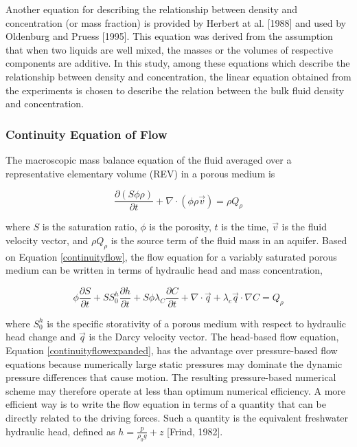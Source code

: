 Another equation for describing the relationship between density and
concentration (or mass fraction) is provided by Herbert at al.
[1988] and used by Oldenburg and Pruess [1995]. This equation was
derived from the assumption that when two liquids are well mixed,
the masses or the volumes of respective components are additive. In
this study, among these equations which describe the relationship
between density and concentration, the linear equation obtained from
the experiments is chosen to describe the relation between the bulk
fluid density and concentration.

\subsubsection{Continuity Equation of Flow}\label{SS:ContinuityFlowEquation}
The macroscopic mass balance equation of the fluid averaged over a
representative elementary volume (REV) in a porous medium is

\begin{equation}\label{continuityflow}
\frac{{\partial \left( {S\phi \rho } \right)}}{{\partial t}} +
\nabla  \cdot \left( {\phi \rho \vec v} \right) = \rho Q_\rho
\end{equation}

where $S$ is the saturation ratio, $\phi$ is the porosity, $t$ is
the time, $\vec v$ is the fluid velocity vector, and $\rho Q_\rho$
is the source term of the fluid mass in an aquifer. Based on
Equation \ref{continuityflow}, the flow equation for a variably
saturated porous medium can be written in terms of hydraulic head
and mass concentration,

\begin{equation}\label{continuityflowexpanded}
\phi \frac{{\partial S}}{{\partial t}} + SS_0^h \frac{{\partial
h}}{{\partial t}} + S\phi \lambda _C \frac{{\partial C}}{{\partial
t}} + \nabla  \cdot \vec q + \lambda _c \vec q \cdot \nabla C =
Q_\rho
\end{equation}

where $S_0^h$ is the specific storativity of a porous medium with
respect to hydraulic head change and $\vec q$ is the Darcy velocity
vector. The head-based flow equation, Equation
\ref{continuityflowexpanded}, has the advantage over pressure-based
flow equations because numerically large static pressures may
dominate the dynamic pressure differences that cause motion. The
resulting pressure-based numerical scheme may therefore operate at
less than optimum numerical efficiency. A more efficient way is to
write the flow equation in terms of a quantity that can be directly
related to the driving forces. Such a quantity is the equivalent
freshwater hydraulic head, defined as $h = \frac{p}{{\rho _0 g}} +
z$ [Frind, 1982].

